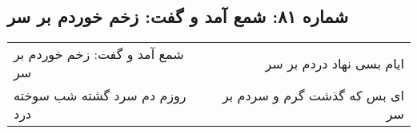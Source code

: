 \begin{center}
\section*{شماره ۸۱: شمع آمد و گفت: زخم خوردم بر سر}
\label{sec:081}
\begin{longtable}{l p{0.5cm} r}
شمع آمد و گفت: زخم خوردم بر سر
&&
ایام بسی نهاد دردم بر سر
\\
روزم دم سرد گشته شب سوخته درد
&&
ای بس که گذشت گرم و سردم بر سر
\\
\end{longtable}
\end{center}
